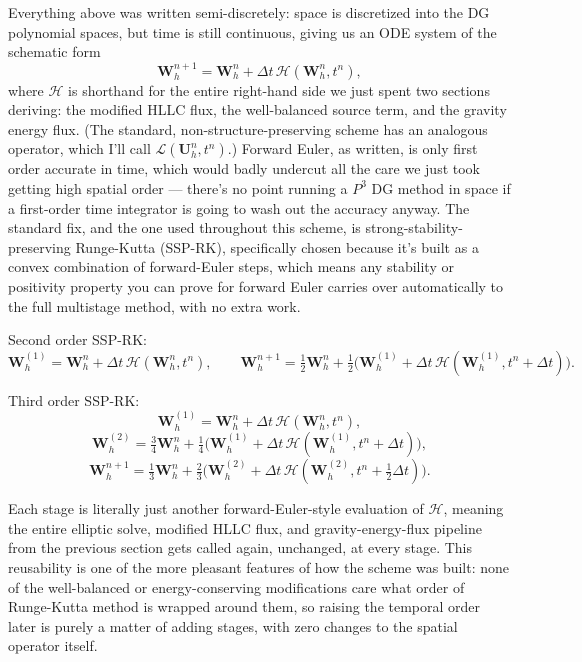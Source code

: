 Everything above was written semi-discretely: space is discretized into the DG polynomial spaces, but time is still continuous, giving us an ODE system of the schematic form
\[
	\mathbf{W}_h^{n+1} = \mathbf{W}_h^n + \Delta t\, \mathcal{H}(\mathbf{W}_h^n, t^n),
\]
where $\mathcal{H}$ is shorthand for the entire right-hand side we just spent two sections deriving: the modified HLLC flux, the well-balanced source term, and the gravity energy flux. (The standard, non-structure-preserving scheme has an analogous operator, which I'll call $\mathcal{L}(\mathbf{U}_h^n,t^n)$.) Forward Euler, as written, is only first order accurate in time, which would badly undercut all the care we just took getting high spatial order — there's no point running a $P^3$ DG method in space if a first-order time integrator is going to wash out the accuracy anyway. The standard fix, and the one used throughout this scheme, is strong-stability-preserving Runge-Kutta (SSP-RK), specifically chosen because it's built as a convex combination of forward-Euler steps, which means any stability or positivity property you can prove for forward Euler carries over automatically to the full multistage method, with no extra work.

Second order SSP-RK:
\[
	\mathbf{W}_h^{(1)} = \mathbf{W}_h^n + \Delta t\,\mathcal{H}(\mathbf{W}_h^n, t^n), \qquad
	\mathbf{W}_h^{n+1} = \tfrac{1}{2}\mathbf{W}_h^n + \tfrac{1}{2}\Big(\mathbf{W}_h^{(1)} + \Delta t\,\mathcal{H}(\mathbf{W}_h^{(1)}, t^n+\Delta t)\Big).
\]

Third order SSP-RK:
\[
	\mathbf{W}_h^{(1)} = \mathbf{W}_h^n + \Delta t\,\mathcal{H}(\mathbf{W}_h^n, t^n),
\]
\[
	\mathbf{W}_h^{(2)} = \tfrac34 \mathbf{W}_h^n + \tfrac14\Big(\mathbf{W}_h^{(1)} + \Delta t\,\mathcal{H}(\mathbf{W}_h^{(1)}, t^n+\Delta t)\Big),
\]
\[
	\mathbf{W}_h^{n+1} = \tfrac13 \mathbf{W}_h^n + \tfrac23\Big(\mathbf{W}_h^{(2)} + \Delta t\,\mathcal{H}(\mathbf{W}_h^{(2)}, t^n+\tfrac12\Delta t)\Big).
\]

Each stage is literally just another forward-Euler-style evaluation of $\mathcal{H}$, meaning the entire elliptic solve, modified HLLC flux, and gravity-energy-flux pipeline from the previous section gets called again, unchanged, at every stage. This reusability is one of the more pleasant features of how the scheme was built: none of the well-balanced or energy-conserving modifications care what order of Runge-Kutta method is wrapped around them, so raising the temporal order later is purely a matter of adding stages, with zero changes to the spatial operator itself.

